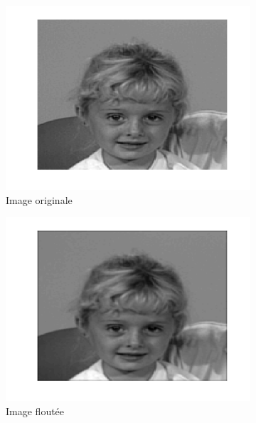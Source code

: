 \begin{figure}
  \centering
  \begin{subfigure}[b]{0.45\textwidth}
    \includegraphics[width=\textwidth]{Q2/original_20.png}
    \caption{Image originale}
    \label{fig:a2original}
  \end{subfigure}%
  \begin{subfigure}[b]{0.45\textwidth}
    \includegraphics[width=\textwidth]{Q2/blurred_20.png}
    \caption{Image floutée}
    \label{fig:a2blurred}
  \end{subfigure}
  \begin{subfigure}[b]{0.45\textwidth}

\end{subfigure}
\end{figure}
